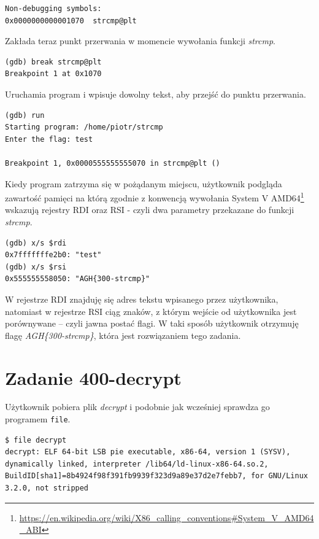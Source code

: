 \documentclass[language=polish,type=eng]{aghmodern}
\begin{document}
\begin{appendices}
\begin{verbatim}
Non-debugging symbols:
0x0000000000001070  strcmp@plt
\end{verbatim}

Zakłada teraz punkt przerwania w momencie wywołania funkcji \emph{strcmp}.

\begin{verbatim}
(gdb) break strcmp@plt
Breakpoint 1 at 0x1070
\end{verbatim}

Uruchamia program i wpisuje dowolny tekst, aby przejść do punktu przerwania.

\begin{verbatim}
(gdb) run
Starting program: /home/piotr/strcmp 
Enter the flag: test

Breakpoint 1, 0x0000555555555070 in strcmp@plt ()
\end{verbatim}

Kiedy program zatrzyma się w pożądanym miejscu, użytkownik podgląda zawartość pamięci na którą
zgodnie z konwencją wywołania System V AMD64\footnote{
\url{https://en.wikipedia.org/wiki/X86_calling_conventions\#System_V_AMD64_ABI}}
wskazują rejestry RDI oraz RSI - czyli dwa parametry przekazane do funkcji \emph{strcmp}.

\begin{verbatim}
(gdb) x/s $rdi
0x7fffffffe2b0: "test"
(gdb) x/s $rsi
0x555555558050: "AGH{300-strcmp}"
\end{verbatim}

W rejestrze RDI znajduję się adres tekstu wpisanego przez użytkownika, natomiast
w rejestrze RSI ciąg znaków, z którym wejście od użytkownika jest porównywane -- czyli
jawna postać flagi. W taki sposób użytkownik otrzymuję flagę \emph{AGH\{300-strcmp\}},
która jest rozwiązaniem tego zadania.

\section{Zadanie 400-decrypt}

Użytkownik pobiera plik \emph{decrypt} i podobnie jak wcześniej
sprawdza go programem \texttt{file}.

\begin{verbatim}
$ file decrypt
decrypt: ELF 64-bit LSB pie executable, x86-64, version 1 (SYSV), dynamically linked, interpreter /lib64/ld-linux-x86-64.so.2, BuildID[sha1]=8b4924f98f391fb9939f323d9a89e37d2e7febb7, for GNU/Linux 3.2.0, not stripped
\end{verbatim}


\end{appendices}
\end{document}
